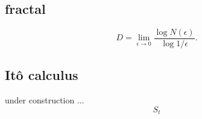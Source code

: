 
\chapter{\appendixname}

\section{fractal}
\label{app:fractal}
\begin{equation}
D = \lim_{\epsilon \rightarrow 0} \frac{\log N(\epsilon)}{\log {1/\epsilon}}.
\end{equation}


\section{It\^o calculus}
\label{app:Ito}
under construction ...
\begin{equation}
S_{t}
\end{equation}

